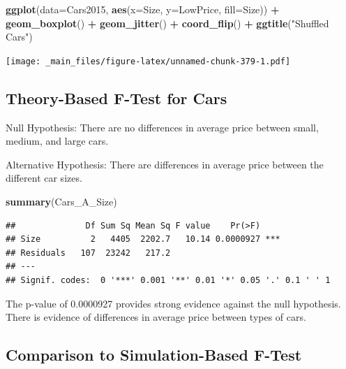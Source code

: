\documentclass[]{book}
\newenvironment{Shaded}{\begin{snugshade}}{\end{snugshade}}
\newcommand{\KeywordTok}[1]{\textcolor[rgb]{0.13,0.29,0.53}{\textbf{#1}}}
\newcommand{\DataTypeTok}[1]{\textcolor[rgb]{0.13,0.29,0.53}{#1}}
\newcommand{\StringTok}[1]{\textcolor[rgb]{0.31,0.60,0.02}{#1}}
\newcommand{\OperatorTok}[1]{\textcolor[rgb]{0.81,0.36,0.00}{\textbf{#1}}}
\newcommand{\NormalTok}[1]{#1}
\begin{document}
\begin{Shaded}
\begin{Highlighting}[]
\KeywordTok{ggplot}\NormalTok{(}\DataTypeTok{data=}\NormalTok{Cars2015, }\KeywordTok{aes}\NormalTok{(}\DataTypeTok{x=}\NormalTok{Size, }\DataTypeTok{y=}\NormalTok{LowPrice, }\DataTypeTok{fill=}\NormalTok{Size)) }\OperatorTok{+}\StringTok{ }
\StringTok{  }\KeywordTok{geom_boxplot}\NormalTok{() }\OperatorTok{+}\StringTok{ }\KeywordTok{geom_jitter}\NormalTok{() }\OperatorTok{+}\StringTok{ }\KeywordTok{coord_flip}\NormalTok{() }\OperatorTok{+}\StringTok{ }\KeywordTok{ggtitle}\NormalTok{(}\StringTok{"Shuffled Cars"}\NormalTok{)}
\end{Highlighting}
\end{Shaded}

\texttt{[image: \_main\_files/figure-latex/unnamed-chunk-379-1.pdf]}

\subsection{Theory-Based F-Test for
Cars}\label{theory-based-f-test-for-cars}

Null Hypothesis: There are no differences in average price between
small, medium, and large cars.

Alternative Hypothesis: There are differences in average price between
the different car sizes.

\begin{Shaded}
\begin{Highlighting}[]
\KeywordTok{summary}\NormalTok{(Cars_A_Size)}
\end{Highlighting}
\end{Shaded}

\begin{verbatim}
##              Df Sum Sq Mean Sq F value    Pr(>F)    
## Size          2   4405  2202.7   10.14 0.0000927 ***
## Residuals   107  23242   217.2                      
## ---
## Signif. codes:  0 '***' 0.001 '**' 0.01 '*' 0.05 '.' 0.1 ' ' 1
\end{verbatim}

The p-value of 0.0000927 provides strong evidence against the null
hypothesis. There is evidence of differences in average price between
types of cars.

\subsection{Comparison to Simulation-Based
F-Test}\label{comparison-to-simulation-based-f-test}
\end{document}
